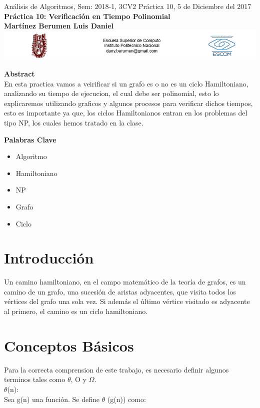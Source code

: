 \documentclass[spanish]{article}
\begin{document}
	\setmarginsrb{30mm}{30mm}{30mm}{30mm}{0pt}{0mm}{0pt}{0mm}
	
	\begin{center}
	{ Análisis de Algoritmos, Sem: 2018-1, 3CV2 Práctica 10, 5 de Diciembre del 2017}\\
{ {\bf Práctica 10: Verificación en Tiempo Polinomial}} \\
{ {\bf Martínez Berumen Luis Daniel}} \\
\includegraphics[width=1\textwidth, right]{./imagenes/logos.png}
	\end{center}

	\bigskip
	
	\bigskip
	
	\bigskip
	
	{\LARGE {\bf Abstract}}\\
	
	En esta practica vamos a veirificar si un grafo es o no es un ciclo Hamiltoniano, analizando su tiempo de ejecucion, el cual debe ser polinomial, esto lo explicaremos utilizando graficos y algunos procesos para verificar dichos tiempos, esto es importante ya que, los ciclos Hamiltonianos entran en los problemas del tipo NP, los cuales hemos tratado en la clase.

	\bigskip


	{\Large {\bf Palabras Clave}}\\
	\begin{itemize}
		\item Algoritmo
		\item Hamiltoniano
		\item NP
		\item Grafo
		\item Ciclo
	\end{itemize}
	
	\section{Introducci\'on}
	Un camino hamiltoniano, en el campo matemático de la teoría de grafos, es un camino de un grafo, una sucesión de aristas adyacentes, que visita todos los vértices del grafo una sola vez. Si además el último vértice visitado es adyacente al primero, el camino es un ciclo hamiltoniano.
\newpage
	\section{Conceptos B\'asicos}
	Para la correcta comprension de este trabajo, es necesario definir algunos terminos tales como $\theta$, O y $\Omega$.\\
	 $\theta$(n):\\
		Sea g(n) una función. Se define  $\theta$ (g(n)) como:\\
		
\end{document}
